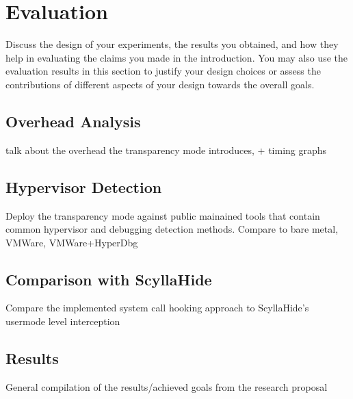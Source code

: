 \section{Evaluation}\label{s:evaluation}

Discuss the design of your experiments, the results you obtained, and how they
help in evaluating the claims you made in the introduction. You may also use the
evaluation results in this section to justify your design choices or assess the
contributions of different aspects  of your design towards the overall goals.

\subsection{Overhead Analysis}
talk about the overhead the transparency mode introduces, + timing graphs

\subsection{Hypervisor Detection}
Deploy the transparency mode against public mainained tools that contain common hypervisor and debugging detection methods. Compare to bare metal, VMWare, VMWare+HyperDbg

\subsection{Comparison with ScyllaHide}
Compare the implemented system call hooking approach to ScyllaHide's usermode level interception

\subsection{Results}
General compilation of the results/achieved goals from the research proposal


